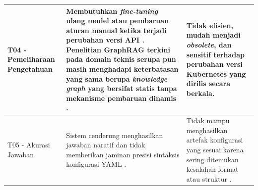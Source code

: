 \begin{longtable}{ p{3cm} p{5cm} p{5cm} }
T04 - Pemeliharaan Pengetahuan &
Membutuhkan \textit{fine-tuning} ulang model atau pembaruan aturan manual ketika terjadi perubahan versi API \parencite{rag_survey}. Penelitian GraphRAG terkini pada domain teknis serupa pun masih menghadapi keterbatasan yang sama berupa \textit{knowledge graph} yang bersifat statis tanpa mekanisme pembaruan dinamis \parencite{civiot2025graphrag, hsgrag2025acm}. &
Tidak efisien, mudah menjadi \textit{obsolete}, dan sensitif terhadap perubahan versi Kubernetes yang dirilis secara berkala. \\ \hline

T05 - Akurasi Jawaban &
Sistem cenderung menghasilkan jawaban naratif dan tidak memberikan jaminan presisi sintaksis konfigurasi YAML \parencite{liu2024deepanalysis}. &
Tidak mampu menghasilkan artefak konfigurasi yang sesuai karena sering ditemukan kesalahan format atau struktur \parencite{rahman2023misconfigurations}. \\ \hline

\end{longtable}
